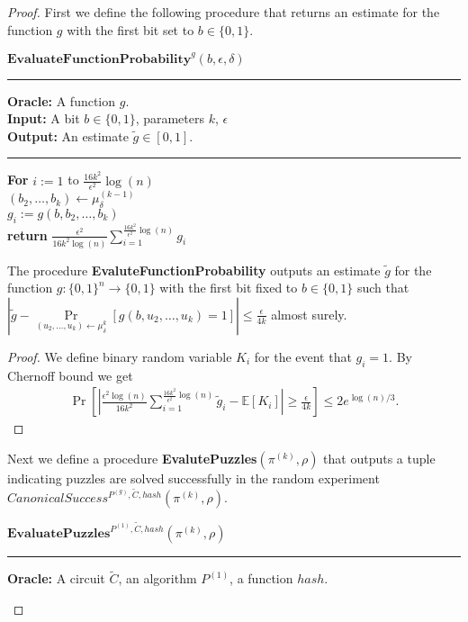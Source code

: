 \begin{proof}
%
First we define the following procedure that returns an estimate for the function $g$ with the first bit set to $b \in \{0,1\}$.
%
\begin{codeblock}
  $\textbf{EvaluateFunctionProbability}^{g}(b, \epsilon, \delta)$
  \medskip
  \hrule
  \medskip
  \textbf{Oracle:} A function $g$.\\
  \textbf{Input:} A bit $b \in \{0,1\}$, parameters $k$, $\epsilon$ \\
  \textbf{Output:} An estimate $\widetilde{g} \in \left[0,1\right]$.
  \medskip\hrule\medskip
  \textbf{For} $i:=1$ to $\frac{16k^2}{\epsilon^2}\log(n)$ \Do \\
  \IndI $(b_2, \dots, b_k) \leftarrow \mu_{\delta}^{(k-1)}$ \\
  \IndI $g_i := g(b,b_2, \dots, b_k)$ \then \\
  \textbf{return} $\frac{\epsilon^2}{16k^2\log(n)} \sum_{i=1}^{\frac{16k^2}{\epsilon^2}\log(n)} g_i$
\end{codeblock}
%
\begin{lemma}
  \label{lemma:estimate_of_g}
  The procedure \textbf{EvaluteFunctionProbability} outputs an estimate $\widetilde{g}$ for the function $g: \{0,1\}^{n} \rightarrow \{0,1\}$ with the first bit fixed to $b \in \{0,1\}$
  such that $| \widetilde{g} - \underset{(u_2,\dots,u_k) \leftarrow \mu_{\delta}^{k}}{\Pr}\left[g(b,u_2, \dots, u_k) = 1\right] | \leq \frac{\epsilon}{4k}$ almost surely.
\end{lemma}
%
\begin{proof}
We define binary random variable $K_i$ for the event that $g_i = 1$.
By Chernoff bound we get
\begin{align*}
  \underset{}{\Pr}\left[\left|\frac{\epsilon^2 \log(n)}{16k^2} \sum_{i=1}^{\frac{16k^2}{\epsilon^2}\log(n)} \widetilde{g}_i - \mathbb{E}[K_i]\right| \geq \frac{\epsilon}{4k}  \right] \leq 2e^{\log(n)/3}.
\end{align*}
\end{proof}
%
Next we define a procedure \textbf{EvalutePuzzles}$(\pi^{(k)}, \rho)$ that outputs a tuple indicating puzzles are solved successfully
in the random experiment $CanonicalSuccess^{P^{(g)}, \widetilde{C}, hash}(\pi^{(k)}, \rho)$.
%
\begin{codeblock}
  $\textbf{EvaluatePuzzles}^{P^{(1)}, \widetilde{C}, hash}(\pi^{(k)}, \rho)$
  \medskip \hrule \medskip
  \textbf{Oracle:}  A circuit $\widetilde{C}$, an algorithm $P^{(1)}$, a function $hash$.\\

\end{codeblock}
\end{proof}
